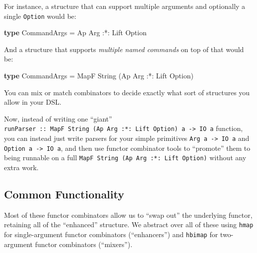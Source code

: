 \documentclass[]{article}
\newenvironment{Shaded}{}{}
\newcommand{\DataTypeTok}[1]{\textcolor[rgb]{0.56,0.13,0.00}{#1}}
\newcommand{\KeywordTok}[1]{\textcolor[rgb]{0.00,0.44,0.13}{\textbf{#1}}}
\newcommand{\NormalTok}[1]{#1}
\newcommand{\OperatorTok}[1]{\textcolor[rgb]{0.40,0.40,0.40}{#1}}
\newcommand{\OtherTok}[1]{\textcolor[rgb]{0.00,0.44,0.13}{#1}}
\begin{document}
For instance, a structure that can support multiple arguments and optionally a
single \texttt{Option} would be:

\begin{Shaded}
\begin{Highlighting}[]
\KeywordTok{type} \DataTypeTok{CommandArgs} \OtherTok{=} \DataTypeTok{Ap} \DataTypeTok{Arg} \OperatorTok{:*:} \DataTypeTok{Lift} \DataTypeTok{Option}
\end{Highlighting}
\end{Shaded}

And a structure that supports \emph{multiple named commands} on top of that
would be:

\begin{Shaded}
\begin{Highlighting}[]
\KeywordTok{type} \DataTypeTok{CommandArgs} \OtherTok{=} \DataTypeTok{MapF} \DataTypeTok{String}\NormalTok{ (}\DataTypeTok{Ap} \DataTypeTok{Arg} \OperatorTok{:*:} \DataTypeTok{Lift} \DataTypeTok{Option}\NormalTok{)}
\end{Highlighting}
\end{Shaded}

You can mix or match combinators to decide exactly what sort of structures you
allow in your DSL.

Now, instead of writing one ``giant''
\texttt{runParser\ ::\ MapF\ String\ (Ap\ Arg\ :*:\ Lift\ Option)\ a\ -\textgreater{}\ IO\ a}
function, you can instead just write parsers for your simple primitives
\texttt{Arg\ a\ -\textgreater{}\ IO\ a} and
\texttt{Option\ a\ -\textgreater{}\ IO\ a}, and then use functor combinator
tools to ``promote'' them to being runnable on a full
\texttt{MapF\ String\ (Ap\ Arg\ :*:\ Lift\ Option)} without any extra work.

\subsection{Common Functionality}\label{common-functionality}

Most of these functor combinators allow us to ``swap out'' the underlying
functor, retaining all of the ``enhanced'' structure. We abstract over all of
these using \texttt{hmap} for single-argument functor combinators
(``enhancers'') and \texttt{hbimap} for two-argument functor combinators
(``mixers'').
\end{document}
